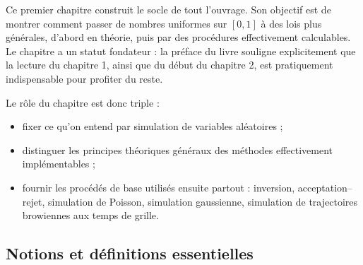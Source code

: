 \documentclass[11pt,a4paper]{article}
\begin{document}
Ce premier chapitre construit le socle de tout l'ouvrage. Son objectif est de montrer comment passer de nombres uniformes sur $[0,1]$ à des lois plus générales, d'abord en théorie, puis par des procédures effectivement calculables. Le chapitre a un statut fondateur : la préface du livre souligne explicitement que la lecture du chapitre 1, ainsi que du début du chapitre 2, est pratiquement indispensable pour profiter du reste.

Le rôle du chapitre est donc triple :
\begin{itemize}
  \item fixer ce qu'on entend par simulation de variables aléatoires ;
  \item distinguer les principes théoriques généraux des méthodes effectivement implémentables ;
  \item fournir les procédés de base utilisés ensuite partout : inversion, acceptation--rejet, simulation de Poisson, simulation gaussienne, simulation de trajectoires browiennes aux temps de grille.
\end{itemize}

\subsection{Notions et définitions essentielles}
\end{document}
